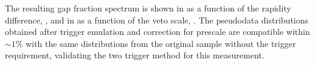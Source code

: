 The resulting gap fraction spectrum is shown in 
as a function of the rapidity difference, \DeltaY, and in 
as a function of the veto scale, \Qnought. The pseudodata distributions obtained after
trigger emulation and correction for prescale are compatible within $\sim1\%$
with the same distributions from the original \MC sample without the trigger
requirement, validating the two trigger method for this measurement.

\begin{figure}[htpb]
  \quad
\end{figure}
